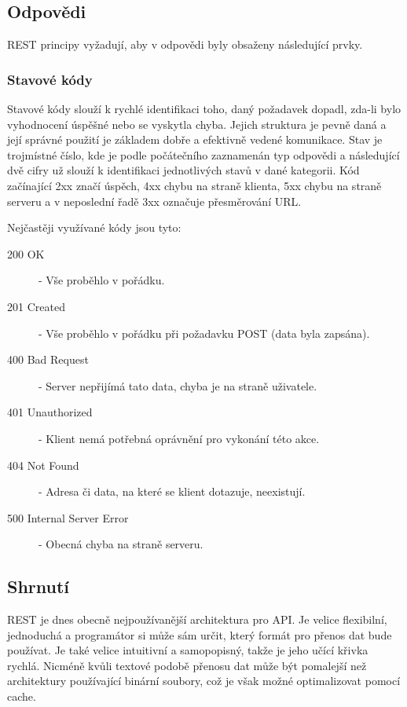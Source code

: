 \subsection{Odpovědi}
REST principy vyžadují, aby v odpovědi byly obsaženy následující prvky.

\subsubsection*{Stavové kódy}
Stavové kódy slouží k rychlé identifikaci toho, daný požadavek dopadl, zda-li bylo vyhodnocení úspěšné nebo se vyskytla chyba. Jejich struktura je pevně daná a její správné použití je základem dobře a efektivně vedené komunikace. Stav je trojmístné číslo, kde je podle počátečního zaznamenán typ odpovědi a následující dvě cifry už slouží k identifikaci jednotlivých stavů v dané kategorii. Kód začínající 2xx značí úspěch, 4xx chybu na straně klienta, 5xx chybu na straně serveru a v neposlední řadě 3xx označuje přesměrování URL.

Nejčastěji využívané kódy jsou tyto:

\begin{description}
    \item[200 OK] - Vše proběhlo v pořádku.
    \item[201 Created] - Vše proběhlo v pořádku při požadavku POST (data byla zapsána).
    \item[400 Bad Request] - Server nepřijímá tato data, chyba je na straně uživatele.
    \item[401 Unauthorized] - Klient nemá potřebná oprávnění pro vykonání této akce.
    \item[404 Not Found] - Adresa či data, na které se klient dotazuje, neexistují.
    \item[500 Internal Server Error] - Obecná chyba na straně serveru.
\end{description}


\subsection{Shrnutí}
REST je dnes obecně nejpoužívanější architektura pro API. Je velice flexibilní, jednoduchá a programátor si může sám určit, který formát pro přenos dat bude používat. Je také velice intuitivní a samopopisný, takže je jeho učící křivka rychlá. Nicméně kvůli textové podobě přenosu dat může být pomalejší než architektury používající binární soubory, což je však možné optimalizovat pomocí cache.


